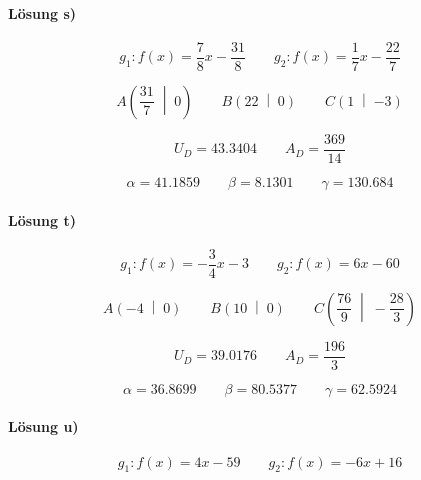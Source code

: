 \paragraph{Lösung s)}
\begin{equation*}
  g_1:f(x)=\frac{\num{7}}{\num{8}}x-\frac{\num{31}}{\num{8}}
  \qquad
  g_2:f(x)=\frac{\num{1}}{\num{7}}x-\frac{\num{22}}{\num{7}}
\end{equation*}

\begin{equation*}
  A\left(\frac{\num{31}}{\num{7}}\;\middle|\;\num{0}\right)
  \qquad
  B\left(\num{22}\;\middle|\;\num{0}\right)
  \qquad
  C\left(\num{1}\;\middle|\;\num{-3}\right)
\end{equation*}

\begin{equation*}
  U_D=\num{43.3404}
  \qquad
  A_D=\frac{\num{369}}{\num{14}}
\end{equation*}

\begin{equation*}
  \alpha=\num{41.1859}
  \qquad
  \beta=\num{8.1301}
  \qquad
  \gamma=\num{130.684}
\end{equation*}

\paragraph{Lösung t)}
\begin{equation*}
  g_1:f(x)=-\frac{\num{3}}{\num{4}}x-\num{3}
  \qquad
  g_2:f(x)=\num{6}x-\num{60}
\end{equation*}

\begin{equation*}
  A\left(\num{-4}\;\middle|\;\num{0}\right)
  \qquad
  B\left(\num{10}\;\middle|\;\num{0}\right)
  \qquad
  C\left(\frac{\num{76}}{\num{9}}\;\middle|\;-\frac{\num{28}}{\num{3}}\right)
\end{equation*}

\begin{equation*}
  U_D=\num{39.0176}
  \qquad
  A_D=\frac{\num{196}}{\num{3}}
\end{equation*}

\begin{equation*}
  \alpha=\num{36.8699}
  \qquad
  \beta=\num{80.5377}
  \qquad
  \gamma=\num{62.5924}
\end{equation*}

\paragraph{Lösung u)}
\begin{equation*}
  g_1:f(x)=\num{4}x-\num{59}
  \qquad
  g_2:f(x)=-\num{6}x+\num{16}
\end{equation*}

